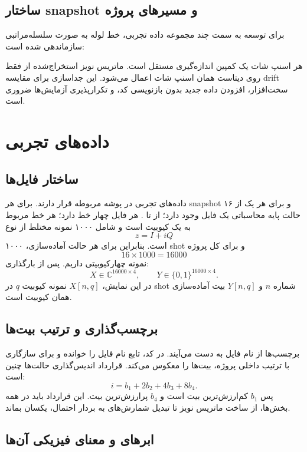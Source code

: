 \subsection*{ساختار snapshot و مسیرهای پروژه}

برای توسعه به سمت چند مجموعه داده تجربی، خط لوله به صورت سلسله‌مراتبی سازماندهی شده است:


هر اسنپ شات یک کمپین اندازه‌گیری مستقل است. ماتریس نویز استخراج‌شده از فقط روی دیتاست همان اسنپ شات اعمال می‌شود. این جداسازی برای مقایسه drift سخت‌افزار، افزودن داده جدید بدون بازنویسی کد، و تکرارپذیری آزمایش‌ها ضروری است.

\section*{داده‌های تجربی }

\subsection*{ساختار فایل‌ها}

داده‌های تجربی در پوشه  مربوطه قرار دارند. برای هر snapshot و برای هر یک از ۱۶ حالت پایه محاسباتی یک فایل وجود دارد؛ از  تا .
هر فایل چهار خط دارد؛ هر خط مربوط به یک کیوبیت است و شامل ۱۰۰۰ نمونه مختلط از نوع
\[
	z = I+iQ
\]
است. بنابراین برای هر حالت آماده‌سازی، ۱۰۰۰ shot و برای کل پروژه
\[
	16 \times 1000 = 16000
\]
نمونه چهارکیوبیتی داریم. پس از بارگذاری:
\[
	X \in \mathbb{C}^{16000\times4}, \qquad
	Y \in \{0,1\}^{16000\times4}.
\]
در این نمایش، $X[n,q]$ نمونه  کیوبیت $q$ در shot شماره $n$ و $Y[n,q]$ بیت آماده‌سازی همان کیوبیت است.

\subsection*{برچسب‌گذاری و ترتیب بیت‌ها}

برچسب‌ها از نام فایل به دست می‌آیند. در کد، تابع  نام فایل را خوانده و برای سازگاری با ترتیب داخلی پروژه، بیت‌ها را معکوس می‌کند. قرارداد اندیس‌گذاری حالت‌ها چنین است:
\begin{equation}
	i=b_1+2b_2+4b_3+8b_4.
	\label{eq:bits-to-int}
\end{equation}
پس $b_1$ کم‌ارزش‌ترین بیت است و $b_4$ پرارزش‌ترین بیت. این قرارداد باید در همه بخش‌ها، از ساخت ماتریس نویز تا تبدیل شمارش‌های  به بردار احتمال، یکسان بماند.

\subsection*{ابرهای  و معنای فیزیکی آن‌ها}

